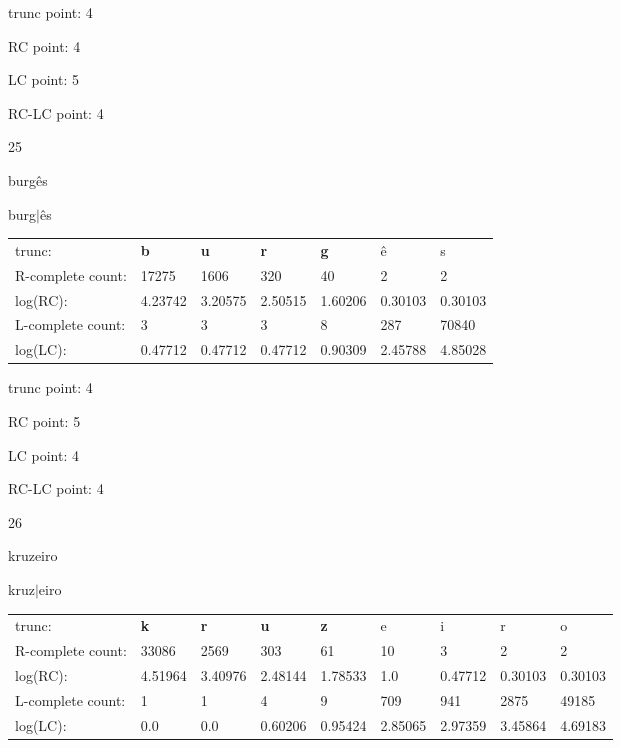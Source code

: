 \documentclass{article}
\begin{document}
trunc point: 4

RC point: 4

LC point: 5

RC-LC point: 4

\vspace{3em}



25

burgês

burg$|$ês

\vspace{1em}

\begin{tabular}{l|llllll}

trunc: & {\color{red}\bf b} & {\color{red}\bf u} & {\color{red}\bf r} & {\color{red}\bf g} & ê & s \\ 
R-complete count: & 17275 & 1606 & 320 & 40 & 2 & 2 \\ 
log(RC): & 4.23742 & 3.20575 & 2.50515 & 1.60206 & 0.30103 & 0.30103 \\ 
L-complete count: & 3 & 3 & 3 & 8 & 287 & 70840 \\ 
log(LC): & 0.47712 & 0.47712 & 0.47712 & 0.90309 & 2.45788 & 4.85028 \\ 
\end{tabular}

trunc point: 4

RC point: 5

LC point: 4

RC-LC point: 4

\vspace{3em}



26

kruzeiro

kruz$|$eiro

\vspace{1em}

\begin{tabular}{l|llllllll}

trunc: & {\color{red}\bf k} & {\color{red}\bf r} & {\color{red}\bf u} & {\color{red}\bf z} & e & i & r & o \\ 
R-complete count: & 33086 & 2569 & 303 & 61 & 10 & 3 & 2 & 2 \\ 
log(RC): & 4.51964 & 3.40976 & 2.48144 & 1.78533 & 1.0 & 0.47712 & 0.30103 & 0.30103 \\ 
L-complete count: & 1 & 1 & 4 & 9 & 709 & 941 & 2875 & 49185 \\ 
log(LC): & 0.0 & 0.0 & 0.60206 & 0.95424 & 2.85065 & 2.97359 & 3.45864 & 4.69183 \\ 
\end{tabular}
\end{document}
